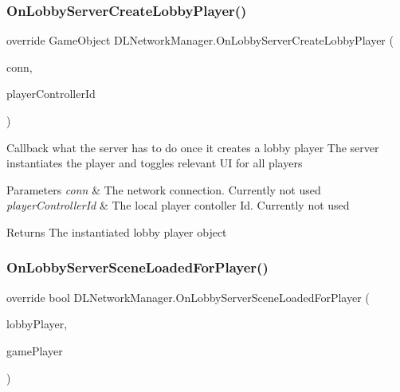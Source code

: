 \subsubsection{\texorpdfstring{On\+Lobby\+Server\+Create\+Lobby\+Player()}{OnLobbyServerCreateLobbyPlayer()}}
{\footnotesize\ttfamily override Game\+Object D\+L\+Network\+Manager.\+On\+Lobby\+Server\+Create\+Lobby\+Player (\begin{DoxyParamCaption}\item[{Network\+Connection}]{conn,  }\item[{short}]{player\+Controller\+Id }\end{DoxyParamCaption})}



Callback what the server has to do once it creates a lobby player The server instantiates the player and toggles relevant UI for all players 


\begin{DoxyParams}{Parameters}
{\em conn} & The network connection. Currently not used\\
\hline
{\em player\+Controller\+Id} & The local player contoller Id. Currently not used\\
\hline
\end{DoxyParams}
\begin{DoxyReturn}{Returns}
The instantiated lobby player object
\end{DoxyReturn}
\hypertarget{class_d_l_network_manager_a011d87a7aa13ad654975c86e61ae1f97}{}\label{class_d_l_network_manager_a011d87a7aa13ad654975c86e61ae1f97} 
\subsubsection{\texorpdfstring{On\+Lobby\+Server\+Scene\+Loaded\+For\+Player()}{OnLobbyServerSceneLoadedForPlayer()}}
{\footnotesize\ttfamily override bool D\+L\+Network\+Manager.\+On\+Lobby\+Server\+Scene\+Loaded\+For\+Player (\begin{DoxyParamCaption}\item[{Game\+Object}]{lobby\+Player,  }\item[{Game\+Object}]{game\+Player }\end{DoxyParamCaption})}



